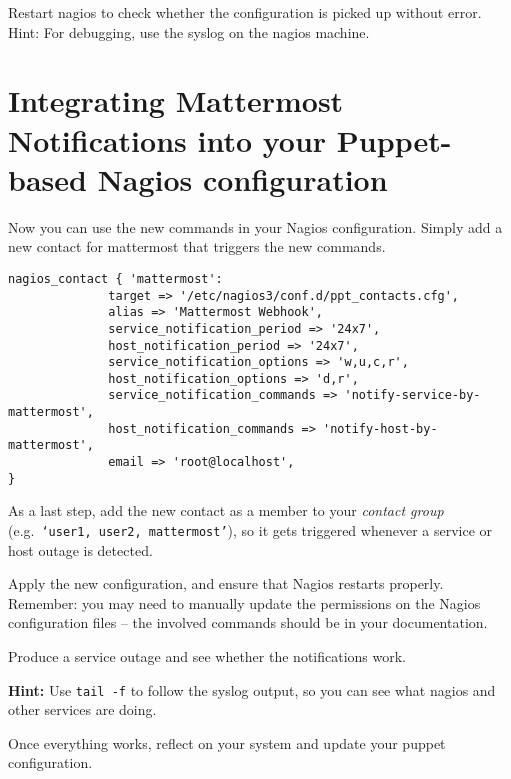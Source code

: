 \documentclass{article}   	%
\begin{document}
Restart nagios to check whether the configuration is picked up without error. Hint: For debugging, use the syslog on the nagios machine.

\section{Integrating Mattermost Notifications into your Puppet-based Nagios configuration}

Now you can use the new commands in your Nagios configuration. Simply add a new contact for mattermost that triggers the new commands.

\begin{verbatim}
nagios_contact { 'mattermost':
              target => '/etc/nagios3/conf.d/ppt_contacts.cfg',
              alias => 'Mattermost Webhook',
              service_notification_period => '24x7',
              host_notification_period => '24x7',
              service_notification_options => 'w,u,c,r',
              host_notification_options => 'd,r',
              service_notification_commands => 'notify-service-by-mattermost',
              host_notification_commands => 'notify-host-by-mattermost',
              email => 'root@localhost',
}
\end{verbatim}

As a last step, add the new contact as a member to your \emph{contact group} (e.g.~{\tt `user1, user2, mattermost'}), so it gets triggered whenever a service or host outage is detected.

Apply the new configuration, and ensure that Nagios restarts properly. Remember: you may need to manually update the permissions on the Nagios configuration files -- the involved commands should be in your documentation. 

Produce a service outage and see whether the notifications work. 

\textbf{Hint:} Use {\tt tail -f} to follow the syslog output, so you can see what nagios and other services are doing.

Once everything works, reflect on your system and update your puppet configuration.
\end{document}
